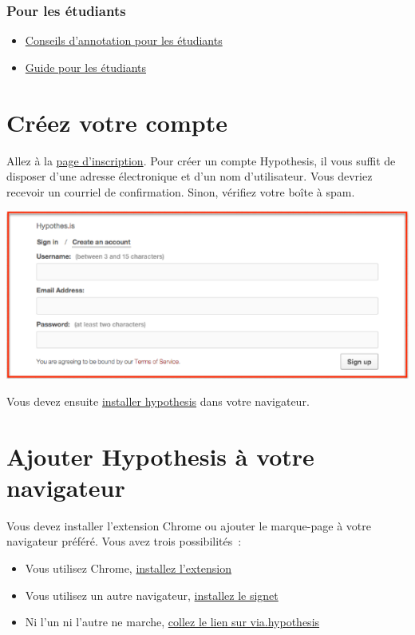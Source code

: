 \documentclass[
]{book}
\providecommand{\tightlist}{%
  \setlength{\itemsep}{0pt}\setlength{\parskip}{0pt}}
\begin{document}
\hypertarget{pour-les-uxe9tudiants}{%
\subsection*{Pour les étudiants}\label{pour-les-uxe9tudiants}}

\begin{itemize}
\tightlist
\item
  \href{https://web.hypothes.is/annotation-tips-for-students/}{Conseils d'annotation pour les étudiants}
\item
  \href{https://web.hypothes.is/student-resource-guide/}{Guide pour les étudiants}
\end{itemize}

\hypertarget{s1}{%
\chapter{Créez votre compte}\label{s1}}

Allez à la \href{https://hypothes.is/signup}{page d'inscription}. Pour créer un compte Hypothesis, il vous suffit de disposer d'une adresse électronique et d'un nom d'utilisateur. Vous devriez recevoir un courriel de confirmation. Sinon, vérifiez votre boîte à spam.

\includegraphics{img/08a7089161c6c5bd7205aa71e717ab6e.png}

Vous devez ensuite \protect\hyperlink{s2}{installer hypothesis} dans votre navigateur.

\hypertarget{s2}{%
\chapter{Ajouter Hypothesis à votre navigateur}\label{s2}}

Vous devez installer l'extension Chrome ou ajouter le marque-page à votre navigateur préféré. Vous avez trois possibilités~:

\begin{itemize}
\tightlist
\item
  Vous utilisez Chrome, \protect\hyperlink{s21}{installez l'extension}
\item
  Vous utilisez un autre navigateur, \protect\hyperlink{s22}{installez le signet}
\item
  Ni l'un ni l'autre ne marche, \protect\hyperlink{s23}{collez le lien sur via.hypothesis}
\end{itemize}
\end{document}
